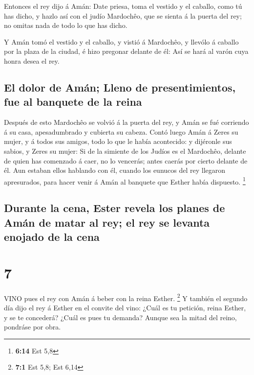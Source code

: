  Entonces el rey dijo á Amán: Date priesa, toma el vestido
y el caballo, como tú has dicho, y hazlo así con el judío Mardochêo, que
se sienta á la puerta del rey; no omitas nada de todo lo que has dicho.

 Y Amán tomó el vestido y el caballo, y vistió á Mardochêo,
y llevólo á caballo por la plaza de la ciudad, é hizo pregonar delante
de él: Así se hará al varón cuya honra desea el rey.

\hypertarget{el-dolor-de-amuxe1n-lleno-de-presentimientos-fue-al-banquete-de-la-reina}{%
\subsection{El dolor de Amán; Lleno de presentimientos, fue al banquete
de la
reina}\label{el-dolor-de-amuxe1n-lleno-de-presentimientos-fue-al-banquete-de-la-reina}}

 Después de esto Mardochêo se volvió á la puerta del rey, y
Amán se fué corriendo á su casa, apesadumbrado y cubierta su cabeza.
 Contó luego Amán á Zeres su mujer, y á todos sus amigos,
todo lo que le había acontecido: y dijéronle sus sabios, y Zeres su
mujer: Si de la simiente de los Judíos es el Mardochêo, delante de quien
has comenzado á caer, no lo vencerás; antes caerás por cierto delante de
él.  Aun estaban ellos hablando con él, cuando los eunucos
del rey llegaron apresurados, para hacer venir á Amán al banquete que
Esther había dispuesto. \footnote{\textbf{6:14} Est 5,8}

\hypertarget{durante-la-cena-ester-revela-los-planes-de-amuxe1n-de-matar-al-rey-el-rey-se-levanta-enojado-de-la-cena}{%
\subsection{Durante la cena, Ester revela los planes de Amán de matar al
rey; el rey se levanta enojado de la
cena}\label{durante-la-cena-ester-revela-los-planes-de-amuxe1n-de-matar-al-rey-el-rey-se-levanta-enojado-de-la-cena}}

\hypertarget{section-6}{%
\section{7}\label{section-6}}

 VINO pues el rey con Amán á beber con la reina Esther.
\footnote{\textbf{7:1} Est 5,8; Est 6,14}  Y también el
segundo día dijo el rey á Esther en el convite del vino: ¿Cuál es tu
petición, reina Esther, y se te concederá? ¿Cuál es pues tu demanda?
Aunque sea la mitad del reino, pondráse por obra.

